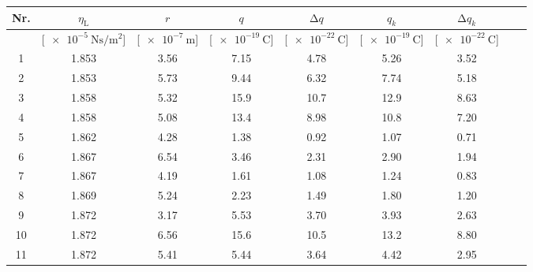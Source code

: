 \documentclass[
  bibliography=totoc,     %
  captions=tableheading,  %
  titlepage=firstiscover, %
]{scrartcl}
\begin{document}
\begin{table}[H]
        \begin{center}
        \captionsetup{width=\linewidth}
        \label{tab:ergebnisse}
            \begin{tabular}{
                    S[table-format =  2.0]
                    S[table-format =  1.3]
                    S[table-format =  1.2]
                    S[table-format =  2.2]
                    S[table-format =  2.2]
                    S[table-format =  2.2]
                    S[table-format =  2.2]
                    S[table-format =  2.0]
                    S[table-format =  2.0]
                    }
                \toprule
                {Nr.} &
                {$\eta_{\mathup{L}}$} &
                {$r$} &
                {$q$} &
                {$\mathup{\Delta}q$} &
                {$q_{k}$} &
                {$\mathup{\Delta}q_{k}$} \\
                \midrule
                {} &
                {[$\SI{e-5}{\newton\second\per\metre\squared}$]} &
                {[$\SI{e-7}{\metre}$]} &
                {[$\SI{e-19}{\coulomb}$]} &
                {[$\SI{e-22}{\coulomb}$]} &
                {[$\SI{e-19}{\coulomb}$]} &
                {[$\SI{e-22}{\coulomb}$]} \\
                 & 1.853 & 3.56 & 7.15 & 4.78 & 5.26 & 3.52 \\
                 2 & 1.853 & 5.73 & 9.44 & 6.32 & 7.74 & 5.18 \\
                 3 & 1.858 & 5.32 & 15.9 & 10.7 & 12.9 & 8.63 \\
                 4 & 1.858 & 5.08 & 13.4 & 8.98 & 10.8 & 7.20 \\
                 5 & 1.862 & 4.28 & 1.38 & 0.92 & 1.07 & 0.71 \\
                 6 & 1.867 & 6.54 & 3.46 & 2.31 & 2.90 & 1.94 \\
                 7 & 1.867 & 4.19 & 1.61 & 1.08 & 1.24 & 0.83 \\
                 8 & 1.869 & 5.24 & 2.23 & 1.49 & 1.80 & 1.20 \\
                 9 & 1.872 & 3.17 & 5.53 & 3.70 & 3.93 & 2.63 \\
                10 & 1.872 & 6.56 & 15.6 & 10.5 & 13.2 & 8.80 \\
                11 & 1.872 & 5.41 & 5.44 & 3.64 & 4.42 & 2.95 \\

\end{tabular}
\end{center}
\end{table}
\end{document}
